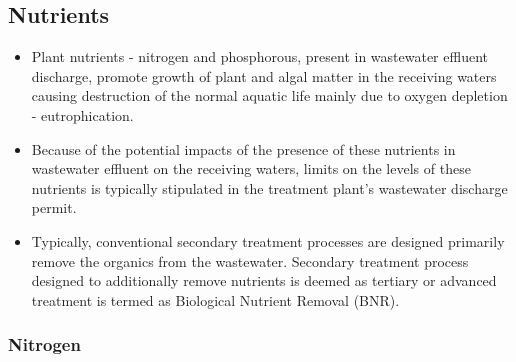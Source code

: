 \documentclass{article}
\begin{document}
\subsection{Nutrients}	
			\begin{itemize}
				\item Plant nutrients - nitrogen and phosphorous, present in wastewater effluent discharge, promote growth of plant and algal matter in the receiving waters causing destruction of the normal aquatic life mainly due to oxygen depletion - eutrophication.
				      
				\item Because of the potential impacts of the presence of these nutrients in wastewater effluent on the receiving waters,  limits on the levels of these nutrients is typically stipulated in the treatment plant's wastewater discharge permit.
				      
				\item Typically, conventional secondary treatment processes are designed primarily remove the organics from the wastewater.  Secondary treatment process designed to additionally remove nutrients is deemed as tertiary or advanced treatment is termed as Biological Nutrient Removal (BNR).
			\end{itemize}
	\subsubsection{Nitrogen}				
\end{document}
